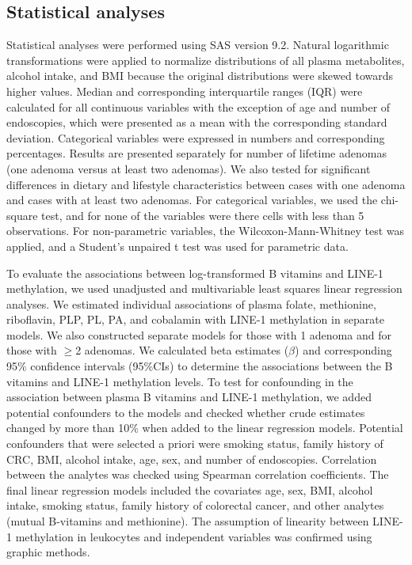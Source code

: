 \subsection{Statistical analyses} %
\noindent Statistical analyses were performed using SAS version 9.2. Natural logarithmic transformations were applied to normalize distributions of all plasma metabolites, alcohol intake, and BMI because the original distributions were skewed towards higher values. Median and corresponding interquartile ranges (IQR) were calculated for all continuous variables with the exception of age and number of endoscopies, which were presented as a mean with the corresponding standard deviation. Categorical variables were expressed in numbers and corresponding percentages. Results are presented separately for number of lifetime adenomas (one adenoma versus at least two adenomas). We also tested for significant differences in dietary and lifestyle characteristics between cases with one adenoma and cases with at least two adenomas. For categorical variables, we used the chi-square test, and for none of the variables were there cells with less than 5 observations. For non-parametric variables, the Wilcoxon-Mann-Whitney test was applied, and a Student's unpaired t test was used for parametric data.

\noindent To evaluate the associations between log-transformed B vitamins and LINE-1 methylation, we used unadjusted and multivariable least squares linear regression analyses. We estimated individual associations of plasma folate, methionine, riboflavin, PLP, PL, PA, and cobalamin with LINE-1 methylation in separate models. We also constructed separate models for those with 1 adenoma and for those with $\geq$2 adenomas. We calculated beta estimates ($\beta$) and corresponding 95\% confidence intervals (95\%CIs) to determine the associations between the B vitamins and LINE-1 methylation levels. To test for confounding in the association between plasma B vitamins and LINE-1 methylation, we added potential confounders to the models and checked whether crude estimates changed by more than 10\% when added to the linear regression models. Potential confounders that were selected a priori were smoking status, family history of CRC, BMI, alcohol intake, age, sex, and number of endoscopies. Correlation between the analytes was checked using Spearman correlation coefficients. The final linear regression models included the covariates age, sex, BMI, alcohol intake, smoking status, family history of colorectal cancer, and other analytes (mutual B-vitamins and methionine). The assumption of linearity between LINE-1 methylation in leukocytes and independent variables was confirmed using graphic methods.


